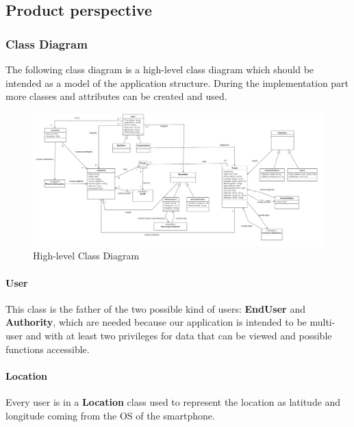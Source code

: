 \subsection{Product perspective}

\subsubsection{Class Diagram} %
The following class diagram is a high-level class diagram which should be intended as a model of the application structure. During the implementation part more classes and attributes can be created and used.


\begin{figure}
\centering
\includegraphics[width=\textwidth]{Images/Class.png}
\caption{\label{fig:classdiagram}High-level Class Diagram}
\end{figure}

\paragraph{User}
This class is the father of the two possible kind of users: \textbf{EndUser} and \textbf{Authority}, which are needed because our application is intended to be multi-user and with at least two privileges for data that can be viewed and possible functions accessible.

\paragraph{Location}
Every user is in a \textbf{Location} class used to represent the location as latitude and longitude coming from the OS of the smartphone.

